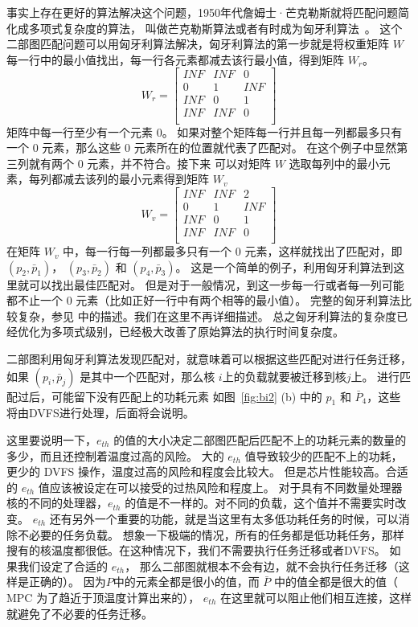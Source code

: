  事实上存在更好的算法解决这个问题，1950年代詹姆士·芒克勒斯就将匹配问题简化成多项式复杂度的算法，
 叫做芒克勒斯算法或者有时成为匈牙利算法~\cite{munkres1957algorithms}。
 这个二部图匹配问题可以用匈牙利算法解决，匈牙利算法的第一步就是将权重矩阵 $W$ 每一行中的最小值找出，每一行各元素都减去该行最小值，得到矩阵 $W_r$。
 \begin{equation}
W_r= 
\left[
\begin{array}{ccc}
INF & INF & 0   \\
0   &  1  & INF  \\
INF &  0  & 1   \\
INF & INF & 0    \\
\end{array}
\right]
\end{equation}
矩阵中每一行至少有一个元素 $0$。 如果对整个矩阵每一行并且每一列都最多只有一个 $0$ 元素，那么这些 $0$ 元素所在的位置就代表了匹配对。
在这个例子中显然第三列就有两个 $0$ 元素，并不符合。接下来 可以对矩阵 $W$ 选取每列中的最小元素，每列都减去该列的最小元素得到矩阵 $W_v$
 \begin{equation}
W_v= 
\left[
\begin{array}{ccc}
INF & INF & 2   \\
0   &  1  & INF  \\
INF &  0  & 1   \\
INF & INF & 0    \\
\end{array}
\right]
\end{equation}
在矩阵 $W_v$ 中，每一行每一列都最多只有一个 $0$ 元素，这样就找出了匹配对，即 $(p_2, \bar{p}_1)$， $(p_3, \bar{p}_2)$ 和 $(p_4, \bar{p}_3)$。
这是一个简单的例子，利用匈牙利算法到这里就可以找出最佳匹配对。
但是对于一般情况，到这一步每一行或者每一列可能都不止一个 $0$ 元素（比如正好一行中有两个相等的最小值）。
完整的匈牙利算法比较复杂，参见 \cite{munkres1957algorithms} 中的描述。我们在这里不再详细描述。
总之匈牙利算法的复杂度已经优化为多项式级别，已经极大改善了原始算法的执行时间复杂度。
 
 二部图利用匈牙利算法发现匹配对，就意味着可以根据这些匹配对进行任务迁移，如果 $(p_i, \bar{p}_j)$ 是其中一个匹配对，那么核 $i$上的负载就要被迁移到核$j$上。
 进行匹配过后，可能留下没有匹配上的功耗元素 如图~\ref{fig:bi2} (b) 中的 $p_1$ 和 $\bar{P}_4$，这些将由DVFS进行处理，后面将会说明。
 
 这里要说明一下，$e_{th}$ 的值的大小决定二部图匹配后匹配不上的功耗元素的数量的多少，而且还控制着温度过高的风险。
 大的 $e_{th}$ 值导致较少的匹配不上的功耗，更少的 DVFS 操作，温度过高的风险和程度会比较大。
 但是芯片性能较高。合适的 $e_{th}$ 值应该被设定在可以接受的过热风险和程度上。 
 对于具有不同数量处理器核的不同的处理器，$e_{th}$ 的值是不一样的。对不同的负载，这个值并不需要实时改变。
 $e_{th}$ 还有另外一个重要的功能，就是当这里有太多低功耗任务的时候，可以消除不必要的任务负载。
 想象一下极端的情况，所有的任务都是低功耗任务，那样搜有的核温度都很低。在这种情况下，我们不需要执行任务迁移或者DVFS。
 如果我们设定了合适的 $e_{th}$， 那么二部图就根本不会有边，就不会执行任务迁移（这样是正确的）。
 因为$P$中的元素全都是很小的值，而 $\bar{P}$ 中的值全都是很大的值（ MPC 为了趋近于顶温度计算出来的），
 $e_{th}$ 在这里就可以阻止他们相互连接，这样就避免了不必要的任务迁移。
 
